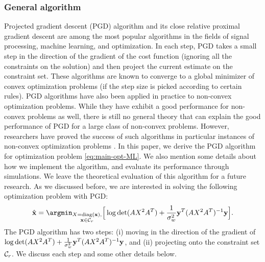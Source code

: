 \documentclass[onecolumn]{IEEEtran}
\begin{document}
\subsubsection{General algorithm}
Projected gradient descent (PGD) algorithm and its close relative proximal gradient descent \cite{combettes2005signal} are among the most popular algorithms in the fields of signal processing, machine learning, and optimization. In each step, PGD takes a small step in the direction of the gradient of the cost function (ignoring all the constraints on the solution) and then project the current estimate on the constraint set. These algorithms are known to converge to a global minimizer of convex optimization problems (if the step size is picked according to certain rules). PGD algorithms  have also been applied in practice to non-convex optimization problems. While they have exhibit a good performance for non-convex problems as well, there is still no general theory that can explain the good performance of PGD for a large class of non-convex problems. However, researchers have proved the success of such algorithms in particular instances of non-convex optimization problems \cite{blumensath2009iterative, beygi2019efficient, bakhshizadeh2020using}. In this paper, we derive the PGD algorithm for optimization problem \eqref{eq:main-opt-ML}. We also mention some details about how we implement the algorithm, and evaluate its performance through simulations. We leave the theoretical evaluation of this algorithm for a future research. As we discussed before, we are interested in solving the following optimization problem with PGD:
\begin{align*}
\hat{\xv}=\argmin_{\substack{X=\diag(\xv), \\ \xv\in\Cc_r}}\Big[ \log\det(AX^2A^T)+{1\over \sigma_w^2}\yv^T(AX^2A^T)^{-1}\yv\Big].
\end{align*}
The PGD algorithm has two steps: (i) moving in the direction of the gradient of $ \log\det(AX^2A^T)+{1\over \sigma_w^2}{\bf y}^T(AX^2A^T)^{-1}{\bf y}$, and (ii) projecting onto the constraint set $\mathcal{C}_r$. We discuss each step and some other details below.  
\end{document}
